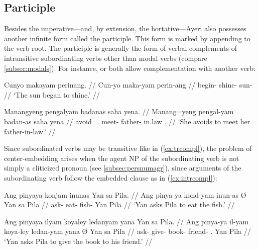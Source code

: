 \subsection{Participle}
\label{subsec:participle}
Besides the imperative---and, by extension, the hortative---Ayeri also 
possesses another infinite form called the participle. This form is marked by 
appending  to the verb root. The participle is generally the 
form of verbal complements of intransitive subordinating verbs other than 
modal verbs (compare \autoref{subsec:modals}). For instance,  
 or  both allow 
complementation with another verb:

\pex
\a\label{ex:intrcompl}\begingl
	\gla Cunyo makayam perinang. // 
	\glb Cun-yo maka-yam perin-ang // 
	\glc begin-\TsgN{} shine-\Ptcp{} sun-\Aarg{} //
	\glft `The sun began to shine.' //
\endgl

\a\label{ex:trcompl}\begingl
	\gla Manangyeng pengalyam badanas saha yena. //
	\glb Manang=yeng pengal-yam badan-as saha yena //
	\glc avoid=\TsgF{}.\Aarg{} meet-\Ptcp{} father-\Parg{} in.law 
		\TsgF{}.\Gen{} //
	\glft `She avoids to meet her father-in-law.' //
\endgl
\xe

Since subordinated verbs may be transitive like in (\ref{ex:trcompl}), the 
problem of center-embedding arises when the agent NP of the subordinating verb 
is not simply a cliticized pronoun (see \autoref{subsec:persnumagr}), since 
arguments of the subordinating verb follow the embedded clause as in 
(\ref{ex:intrcompl}):

\pex[*=\ques\ques]
\a\ljudge{\ques}\begingl
	\gla Ang pinyaya \normalfont{[}konjam inunas\normalfont{]} {} Yan sa 
		Pila. //
	\glb Ang pinya-ya kond-yam inun-as Ø Yan sa Pila //
	\glc \AgtT{} ask-\TsgM{} eat-\Ptcp{} fish-\Parg{} \Top{} Yan \Parg{}
		Pila //
	\glft `Yan asks Pila to eat the fish.' //
\endgl

\a\ljudge{\ques\ques}\begingl
	\gla Ang pinyaya \normalfont{[}ilyam koyaley ledanyam 
		yana\normalfont{]} {} Yan sa Pila. //
	\glb Ang pinya-ya il-yam koya-ley ledan-yam yana Ø Yan sa Pila //
	\glc \AgtT{} ask-\TsgM{} give-\Ptcp{} book-\PargI{} friend-\Dat{} 
		\TsgM{}.\Gen{} \Top{} Yan \Parg{} Pila //
	\glft `Yan asks Pila to give the book to his friend.' //
\endgl
\xe

